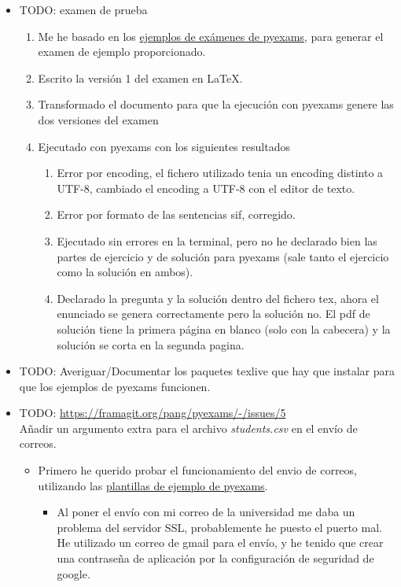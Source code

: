 \begin{itemize}
\begin{itemize}
        \item TODO: examen de prueba
        \begin{enumerate}
            \item Me he basado en los \href{https://framagit.org/pang/pyexams/-/tree/master/examples}{ejemplos de exámenes de pyexams}, para generar el examen de ejemplo proporcionado.
            \item Escrito la versión 1 del examen en LaTeX.
            \item Transformado el documento para que la ejecución con pyexams genere las dos versiones del examen
            \item Ejecutado con pyexams con los siguientes resultados
            \begin{enumerate}
                \item Error por encoding, el fichero utilizado tenia un encoding distinto a UTF-8, cambiado el encoding a UTF-8 con el editor de texto.
                \item Error por formato de las sentencias sif, corregido.
                \item Ejecutado sin errores en la terminal, pero no he declarado bien las partes de ejercicio y de solución para pyexams (sale tanto el ejercicio como la solución en ambos).
                \item Declarado la pregunta y la solución dentro del fichero tex, ahora el enunciado se genera correctamente pero la solución no. El pdf de solución tiene la primera página en blanco (solo con la cabecera) y la solución se corta en la segunda pagina.
            \end{enumerate}
        \end{enumerate}
        \item TODO: Averiguar/Documentar los paquetes texlive que hay que instalar para que los ejemplos de pyexams funcionen.
        \item TODO: \url{https://framagit.org/pang/pyexams/-/issues/5} \\
        Añadir un argumento extra para el archivo \textit{students.csv} en el envío de correos.
        \begin{itemize}
            \item Primero he querido probar el funcionamiento del envio de correos, utilizando las \href{https://framagit.org/pang/pyexams/-/tree/master/examples}{plantillas de ejemplo de pyexams}.
            \begin{itemize}
                \item Al poner el envío con mi correo de la universidad me daba un problema del servidor SSL, probablemente he puesto el puerto mal. He utilizado un correo de gmail para el envío, y he tenido que crear una contraseña de aplicación por la configuración de seguridad de google.

\end{itemize}
\end{itemize}
\end{itemize}
\end{itemize}
